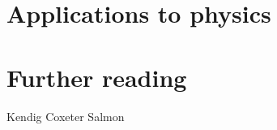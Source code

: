 \documentclass[a4paper,leqno,9pt]{article}
\theoremstyle{exercise}
\theoremstyle{plain}
\theoremstyle{definition}
\begin{document}
\section{Applications to physics}

\section{Further reading}
Kendig
Coxeter
Salmon
\end{document}
